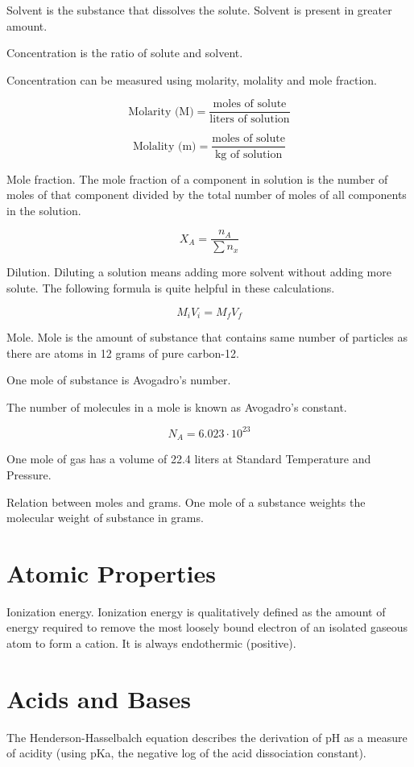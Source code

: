 \documentclass[oneside]{book} %
\theoremstyle{plain}
\begin{document}
Solvent is the substance that dissolves the solute. Solvent is present in
greater amount.

Concentration is the ratio of solute and solvent.

Concentration can be measured using molarity, molality and mole fraction.

\[\text{Molarity (M)} = \frac{\text{moles of solute}}{\text{liters of
solution}}\]

\[\text{Molality (m)} = \frac{\text{moles of solute}}{\text{kg of solution}}\]

Mole fraction. The mole fraction of a component in solution is the number of
moles of that component divided by the total number of moles of all components
in the solution.

\[X_A = \frac{n_A}{\sum{n_x}}\]

Dilution. Diluting a solution means adding more solvent without adding more
solute.
The following formula is quite helpful in these calculations.

\[M_i V_i = M_f V_f\]

Mole. Mole is the amount of substance that contains same number of particles as
there are atoms in 12 grams of pure carbon-12.

One mole of substance is Avogadro's number.

The number of molecules in a mole is known as Avogadro's constant.

\[N_A = 6.023 \cdot 10^{23}\]

One mole of gas has a volume of 22.4 liters at Standard Temperature and
Pressure.

Relation between moles and grams.
One mole of a substance weights the molecular weight of substance in grams.

\chapter{Atomic Properties}

Ionization energy. Ionization energy is qualitatively defined as the amount of
energy required to remove the most loosely bound electron of an isolated
gaseous atom to form a cation. It is always endothermic (positive).

\chapter{Acids and Bases}

The Henderson-Hasselbalch equation describes the derivation of pH as a
measure of acidity (using pKa, the negative log of the acid dissociation
constant).
\end{document}
